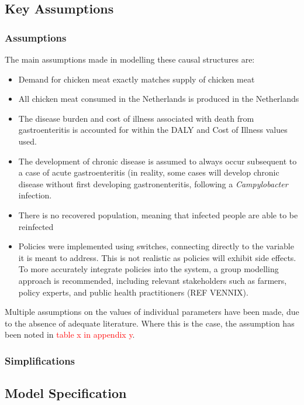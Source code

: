 \subsection{Key Assumptions}
\label{s:assumptions}
\subsubsection{Assumptions}
The main assumptions made in modelling these causal structures are:
\begin{itemize}
    \item Demand for chicken meat exactly matches supply of chicken meat
    \item All chicken meat consumed in the Netherlands is produced in the Netherlands
    \item The disease burden and cost of illness associated with death from gastroenteritis is accounted for within the DALY and Cost of Illness values used.
    \item The development of chronic disease is assumed to always occur subsequent to a case of acute gastroenteritis (in reality, some cases will develop chronic disease without first developing gastronenteritis, following a \textit{Campylobacter} infection.
    \item There is no recovered population, meaning that infected people are able to be reinfected
    \item Policies were implemented using switches, connecting directly to the variable it is meant to address. This is not realistic as policies will exhibit side effects. To more accurately integrate policies into the system,  a group modelling approach is recommended, including relevant stakeholders such as farmers, policy experts, and public health practitioners (REF VENNIX).
\end{itemize}

Multiple assumptions on the values of individual parameters have been made, due to the absence of adequate literature. Where this is the case, the assumption has been noted in \textcolor{red}{table x in appendix y}.
\subsubsection{Simplifications}

\subsection{Model Specification}
